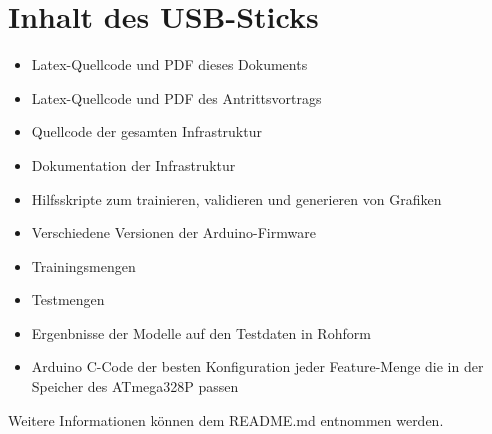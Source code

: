 \chapter{Inhalt des USB-Sticks}
\begin{itemize}
    \item Latex-Quellcode und PDF dieses Dokuments
    \item Latex-Quellcode und PDF des Antrittsvortrags
    \item Quellcode der gesamten Infrastruktur
    \item Dokumentation der Infrastruktur
    \item Hilfsskripte zum trainieren, validieren und generieren von Grafiken
    \item Verschiedene Versionen der Arduino-Firmware
    \item Trainingsmengen
    \item Testmengen
    \item Ergenbnisse der Modelle auf den Testdaten in Rohform
    \item Arduino C-Code der besten Konfiguration jeder Feature-Menge die in der Speicher des ATmega328P passen
\end{itemize}
Weitere Informationen können dem README.md entnommen werden.
